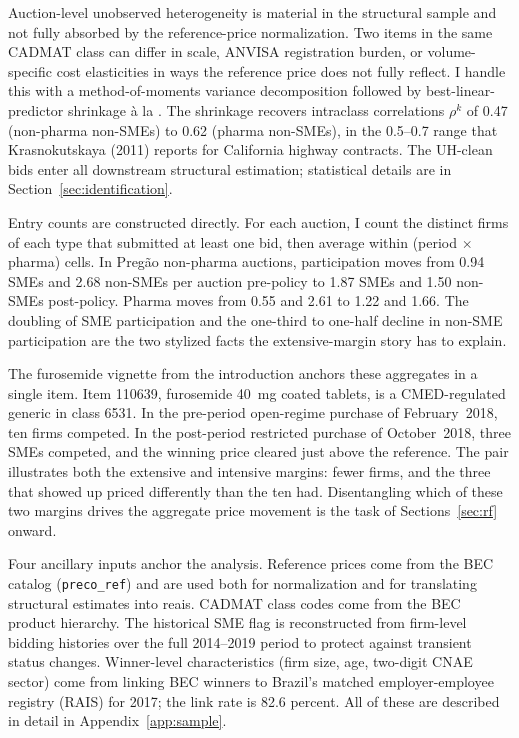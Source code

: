 Auction-level unobserved heterogeneity is material in the structural sample and not fully absorbed by the reference-price normalization. Two items in the same CADMAT class can differ in scale, ANVISA registration burden, or volume-specific cost elasticities in ways the reference price does not fully reflect. I handle this with a method-of-moments variance decomposition followed by best-linear-predictor shrinkage \`a la \citet{krasnokutskaya2011}. The shrinkage recovers intraclass correlations $\rho^k$ of 0.47 (non-pharma non-SMEs) to 0.62 (pharma non-SMEs), in the 0.5--0.7 range that Krasnokutskaya (2011) reports for California highway contracts. The UH-clean bids enter all downstream structural estimation; statistical details are in Section~\ref{sec:identification}.

Entry counts are constructed directly. For each auction, I count the distinct firms of each type that submitted at least one bid, then average within (period $\times$ pharma) cells. In Preg\~ao non-pharma auctions, participation moves from 0.94 SMEs and 2.68 non-SMEs per auction pre-policy to 1.87 SMEs and 1.50 non-SMEs post-policy. Pharma moves from 0.55 and 2.61 to 1.22 and 1.66. The doubling of SME participation and the one-third to one-half decline in non-SME participation are the two stylized facts the extensive-margin story has to explain.

The furosemide vignette from the introduction anchors these aggregates in a single item. Item 110639, furosemide 40~mg coated tablets, is a CMED-regulated generic in class 6531. In the pre-period open-regime purchase of February~2018, ten firms competed. In the post-period restricted purchase of October~2018, three SMEs competed, and the winning price cleared just above the reference. The pair illustrates both the extensive and intensive margins: fewer firms, and the three that showed up priced differently than the ten had. Disentangling which of these two margins drives the aggregate price movement is the task of Sections~\ref{sec:rf} onward.

Four ancillary inputs anchor the analysis. Reference prices come from the BEC catalog (\texttt{preco\_ref}) and are used both for normalization and for translating structural estimates into reais. CADMAT class codes come from the BEC product hierarchy. The historical SME flag is reconstructed from firm-level bidding histories over the full 2014--2019 period to protect against transient status changes. Winner-level characteristics (firm size, age, two-digit CNAE sector) come from linking BEC winners to Brazil's matched employer-employee registry (RAIS) for 2017; the link rate is 82.6 percent. All of these are described in detail in Appendix~\ref{app:sample}.
